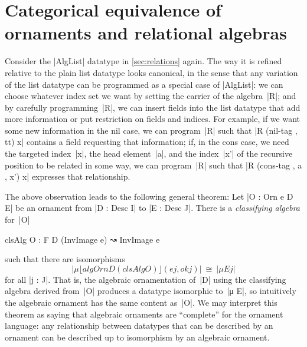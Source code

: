 \chapter{Categorical equivalence of ornaments and relational algebras}
\label{chap:equivalence}


Consider the |AlgList| datatype in \autoref{sec:relations} again.
The way it is refined relative to the plain list datatype looks canonical, in the sense that any variation of the list datatype can be programmed as a special case of |AlgList|:
we can choose whatever index set we want by setting the carrier of the algebra~|R|; and by carefully programming~|R|, we can insert fields into the list datatype that add more information or put restriction on fields and indices.
For example, if we want some new information in the nil case, we can program~|R| such that |R (nil-tag , tt) x| contains a field requesting that information; if, in the cons case, we need the targeted index~|x|, the head element~|a|, and the index~|x'| of the recursive position to be related in some way, we can program~|R| such that |R (cons-tag , a , x') x| expresses that relationship.

The above observation leads to the following general theorem:
Let |O : Orn e D E| be an ornament from |D : Desc I| to |E : Desc J|.
There is a \emph{classifying algebra} for~|O|
\begin{code}clsAlg O : Ḟ D (InvImage e) ↝ InvImage e
\end{code}such that there are isomorphisms
\[ |μ ⌊ algOrn D (clsAlg O) ⌋ (e j , ok j)| ~\cong~ |μ E j| \]
for all |j : J|.
That is, the algebraic ornamentation of~|D| using the classifying algebra derived from~|O| produces a datatype isomorphic to~|μ E|, so intuitively the algebraic ornament has the same content as~|O|.
We may interpret this theorem as saying that algebraic ornaments are ``complete'' for the ornament language: any relationship between datatypes that can be described by an ornament can be described up to isomorphism by an algebraic ornament.

